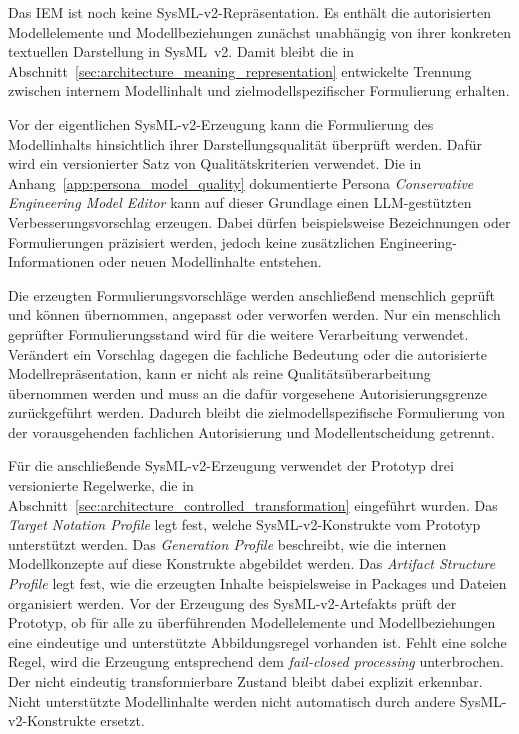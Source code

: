 Das IEM ist noch keine SysML-v2-Repräsentation. Es enthält die autorisierten
Modellelemente und Modellbeziehungen zunächst unabhängig von ihrer konkreten
textuellen Darstellung in SysML~v2. Damit bleibt die in
Abschnitt~\ref{sec:architecture_meaning_representation} entwickelte
Trennung zwischen internem Modellinhalt und zielmodellspezifischer
Formulierung erhalten.

Vor der eigentlichen SysML-v2-Erzeugung kann die Formulierung des
Modellinhalts hinsichtlich ihrer Darstellungsqualität überprüft werden.
Dafür wird ein versionierter Satz von Qualitätskriterien verwendet. Die in
Anhang~\ref{app:persona_model_quality} dokumentierte Persona
\emph{Conservative Engineering Model Editor} kann auf dieser Grundlage
einen LLM-gestützten Verbesserungsvorschlag erzeugen. Dabei dürfen
beispielsweise Bezeichnungen oder Formulierungen präzisiert werden, jedoch
keine zusätzlichen Engineering-Informationen oder neuen Modellinhalte
entstehen.

Die erzeugten Formulierungsvorschläge werden anschließend menschlich
geprüft und können übernommen, angepasst oder verworfen werden. Nur ein
menschlich geprüfter Formulierungsstand wird für die weitere Verarbeitung
verwendet. Verändert ein Vorschlag dagegen die fachliche Bedeutung oder die
autorisierte Modellrepräsentation, kann er nicht als reine
Qualitätsüberarbeitung übernommen werden und muss an die dafür vorgesehene
Autorisierungsgrenze zurückgeführt werden. Dadurch bleibt die
zielmodellspezifische Formulierung von der vorausgehenden fachlichen
Autorisierung und Modellentscheidung getrennt.

Für die anschließende SysML-v2-Erzeugung verwendet der Prototyp drei
versionierte Regelwerke, die in
Abschnitt~\ref{sec:architecture_controlled_transformation} eingeführt
wurden. Das \emph{Target Notation Profile} legt fest, welche
SysML-v2-Konstrukte vom Prototyp unterstützt werden. Das
\emph{Generation Profile} beschreibt, wie die internen Modellkonzepte auf
diese Konstrukte abgebildet werden. Das
\emph{Artifact Structure Profile} legt fest, wie die erzeugten Inhalte
beispielsweise in Packages und Dateien organisiert werden.
\newpage
Vor der Erzeugung des SysML-v2-Artefakts prüft der Prototyp, ob für alle zu
überführenden Modellelemente und Modellbeziehungen eine eindeutige und
unterstützte Abbildungsregel vorhanden ist. Fehlt eine solche Regel, wird
die Erzeugung entsprechend dem \emph{fail-closed processing} unterbrochen.
Der nicht eindeutig transformierbare Zustand bleibt dabei explizit
erkennbar. Nicht unterstützte Modellinhalte werden nicht automatisch durch
andere SysML-v2-Konstrukte ersetzt.

